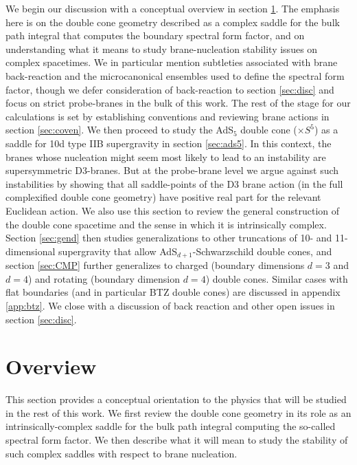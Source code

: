 \documentclass[11pt]{article}
\begin{document}
We begin our discussion with a conceptual overview in section \ref{sec:over}.
The emphasis here is on the double cone geometry described as a complex saddle for the bulk path integral that computes the boundary spectral form factor, and on understanding what it means to study brane-nucleation stability issues on complex spacetimes.  
We in particular mention subtleties associated with brane back-reaction and the microcanonical ensembles used to define the spectral form factor, though we defer consideration of back-reaction to section \ref{sec:disc} and focus on strict probe-branes in the bulk of this work.
The rest of the stage for our calculations is set by establishing conventions and reviewing brane actions in section \ref{sec:coven}.  
We then proceed to study the AdS$_5$ double cone ($\times S^5$) as a saddle for 10d type IIB supergravity in section \ref{sec:ads5}.  
In this context, the branes whose nucleation might seem most likely to lead to an instability are supersymmetric D3-branes.  
But at the probe-brane level we argue against such instabilities by showing that all saddle-points of the D3 brane action (in the full complexified double cone geometry) have positive real part for the relevant Euclidean action.
We also use this section to review the general construction of the double cone spacetime and the sense in which it is intrinsically complex.  
Section \ref{sec:gend} then studies generalizations to other truncations of 10- and 11-dimensional supergravity that allow AdS$_{d+1}$-Schwarzschild double cones, and section \ref{sec:CMP} further generalizes to charged (boundary dimensions $d=3$ and $d=4$) and rotating (boundary dimension $d=4$) double cones. 
Similar cases with flat boundaries (and in particular BTZ double cones) are discussed in appendix \ref{app:btz}. 
We close with a discussion of back reaction and other open issues in section \ref{sec:disc}.

\section{Overview}
\label{sec:over}

This section provides a conceptual orientation to the physics that will be studied in the rest of this work.
We first review the double cone geometry in its role as an intrinsically-complex saddle for the bulk path integral computing the so-called spectral form factor.
We then describe what it will mean to study the stability of such complex saddles with respect to brane nucleation.
\end{document}
